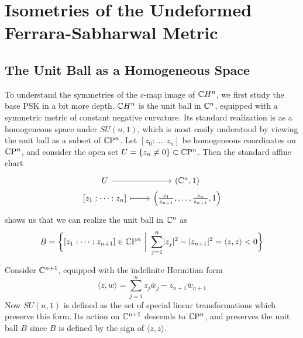 \section{Isometries of the Undeformed Ferrara-Sabharwal Metric}

\subsection{The Unit Ball as a Homogeneous Space}

To understand the symmetries of the $c$-map image of $\mathbb{C} H^n$, we first study the base PSK in a bit more depth. $\mathbb{C} H^n$ is the unit ball in $\mathbb{C}^n$, equipped with a symmetric metric of constant negative curvature. Its standard realization is as a homogeneous space under $SU(n,1)$, which is most easily understood by viewing the unit ball as a subset of $\mathbb{C}\mathrm{P}^n$. Let $[z_0:\dots : z_n]$ be homogeneous coordinates on $\mathbb{C}\mathrm{P}^n$, and consider the open set $U=\{z_n\neq 0\}\subset \mathbb{C}\mathrm{P}^n$. Then the standard affine chart
\begin{equation*}
	\begin{tikzcd}[row sep=0cm]
		U \arrow{r} & (\C^n,1) \\
		{[z_1:\dots : z_n]} \arrow[mapsto]{r} & \Big(\frac{z_1}{z_{n+1}},\dots, \frac{z_n}{z_{n+1}},1\Big)
	\end{tikzcd}
\end{equation*}
shows us that we can realize the unit ball in $\mathbb{C}^n$ as
\begin{equation*}
	B= \bigg\{[z_1:\dots: z_{n+1}]\in \CP^n\ \bigg|\ \sum_{j=1}^n\abs{z_j}^2-\abs{z_{n+1}}^2=\langle z,z\rangle<0\bigg\}
\end{equation*}

Consider $\mathbb{C}^{n+1}$, equipped with the indefinite Hermitian form 
\begin{equation*}
	\langle z, w \rangle = \sum_{j=1}^n z_j \bar w_j - z_{n+1}\bar w_{n+1}
\end{equation*}
Now $SU(n,1)$ is defined as the set of special linear transformations which preserve this form. Its action on $\mathbb{C}^{n+1}$ descends to $\mathbb{C}\mathrm{P}^n$, and preserves the unit ball $B$ since $B$ is defined by the sign of $\langle z,z\rangle$. 

